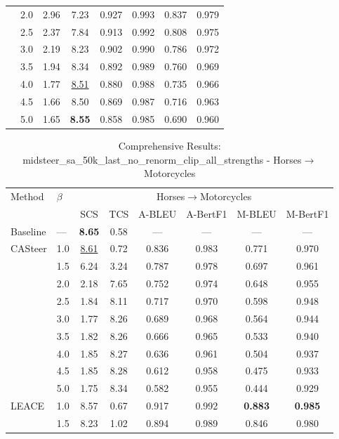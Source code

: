 \begin{table}[htbp]
\begin{tabular}{l|l|cccccc|}
 & 2.0 & 2.96 & 7.23 & 0.927 & 0.993 & 0.837 & 0.979 \\
 & 2.5 & 2.37 & 7.84 & 0.913 & 0.992 & 0.808 & 0.975 \\
 & 3.0 & 2.19 & 8.23 & 0.902 & 0.990 & 0.786 & 0.972 \\
 & 3.5 & 1.94 & 8.34 & 0.892 & 0.989 & 0.760 & 0.969 \\
 & 4.0 & 1.77 & \underline{8.51} & 0.880 & 0.988 & 0.735 & 0.966 \\
 & 4.5 & 1.66 & 8.50 & 0.869 & 0.987 & 0.716 & 0.963 \\
 & 5.0 & 1.65 & \textbf{8.55} & 0.858 & 0.985 & 0.690 & 0.960 \\
\hline
\end{tabular}
\end{table}

\begin{table}[htbp]
\centering
\caption{Comprehensive Results: midsteer\_sa\_50k\_last\_no\_renorm\_clip\_all\_strengths - Horses$\to$Motorcycles}
\label{tab:single_experiment_table_with_clipping_horses_to_motorcycles}
\begin{tabular}{l|l|cccccc|}
\hline
Method & $\beta$ & \multicolumn{6}{c|}{Horses$\rightarrow$Motorcycles} \\
 &  & SCS & TCS & A-BLEU & A-BertF1 & M-BLEU & M-BertF1 \\
\hline
Baseline & — & \textbf{8.65} & 0.58 & — & — & — & — \\
\hline
CASteer & 1.0 & \underline{8.61} & 0.72 & 0.836 & 0.983 & 0.771 & 0.970 \\
 & 1.5 & 6.24 & 3.24 & 0.787 & 0.978 & 0.697 & 0.961 \\
 & 2.0 & 2.18 & 7.65 & 0.752 & 0.974 & 0.648 & 0.955 \\
 & 2.5 & 1.84 & 8.11 & 0.717 & 0.970 & 0.598 & 0.948 \\
 & 3.0 & 1.77 & 8.26 & 0.689 & 0.968 & 0.564 & 0.944 \\
 & 3.5 & 1.82 & 8.26 & 0.666 & 0.965 & 0.533 & 0.940 \\
 & 4.0 & 1.85 & 8.27 & 0.636 & 0.961 & 0.504 & 0.937 \\
 & 4.5 & 1.85 & 8.28 & 0.612 & 0.958 & 0.475 & 0.933 \\
 & 5.0 & 1.75 & 8.34 & 0.582 & 0.955 & 0.444 & 0.929 \\
\hline
LEACE & 1.0 & 8.57 & 0.67 & 0.917 & 0.992 & \textbf{0.883} & \textbf{0.985} \\
 & 1.5 & 8.23 & 1.02 & 0.894 & 0.989 & 0.846 & 0.980 \\

\end{tabular}
\end{table}
